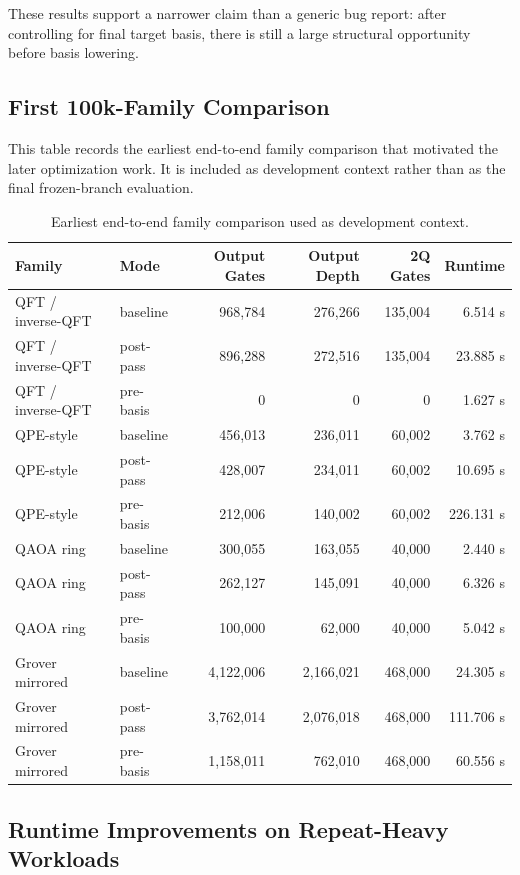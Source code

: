 \documentclass[11pt]{article}
\begin{document}
These results support a narrower claim than a generic bug report: after controlling for final target basis, there is still a large structural opportunity before basis lowering.

\subsection{First 100k-Family Comparison}

This table records the earliest end-to-end family comparison that motivated the later optimization work. It is included as development context rather than as the final frozen-branch evaluation.

\begin{table}[p]
\centering
\begin{tabular}{llrrrr}
\toprule
Family & Mode & Output Gates & Output Depth & 2Q Gates & Runtime \\
\midrule
QFT / inverse-QFT & baseline & 968{,}784 & 276{,}266 & 135{,}004 & 6.514 s \\
QFT / inverse-QFT & post-pass & 896{,}288 & 272{,}516 & 135{,}004 & 23.885 s \\
QFT / inverse-QFT & pre-basis & 0 & 0 & 0 & 1.627 s \\
QPE-style & baseline & 456{,}013 & 236{,}011 & 60{,}002 & 3.762 s \\
QPE-style & post-pass & 428{,}007 & 234{,}011 & 60{,}002 & 10.695 s \\
QPE-style & pre-basis & 212{,}006 & 140{,}002 & 60{,}002 & 226.131 s \\
QAOA ring & baseline & 300{,}055 & 163{,}055 & 40{,}000 & 2.440 s \\
QAOA ring & post-pass & 262{,}127 & 145{,}091 & 40{,}000 & 6.326 s \\
QAOA ring & pre-basis & 100{,}000 & 62{,}000 & 40{,}000 & 5.042 s \\
Grover mirrored & baseline & 4{,}122{,}006 & 2{,}166{,}021 & 468{,}000 & 24.305 s \\
Grover mirrored & post-pass & 3{,}762{,}014 & 2{,}076{,}018 & 468{,}000 & 111.706 s \\
Grover mirrored & pre-basis & 1{,}158{,}011 & 762{,}010 & 468{,}000 & 60.556 s \\
\bottomrule
\end{tabular}
\caption{Earliest end-to-end family comparison used as development context.}
\end{table}

\subsection{Runtime Improvements on Repeat-Heavy Workloads}
\end{document}
